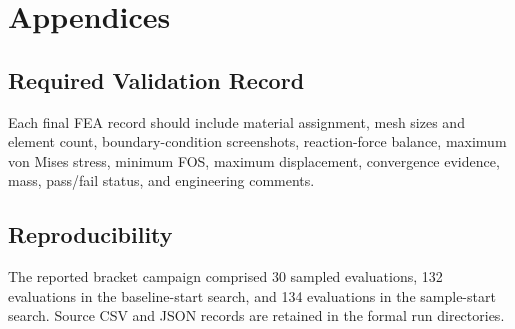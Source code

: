 \chapter{Appendices}

\section{Required Validation Record}
Each final FEA record should include material assignment, mesh sizes and element count, boundary-condition screenshots, reaction-force balance, maximum von Mises stress, minimum FOS, maximum displacement, convergence evidence, mass, pass/fail status, and engineering comments.

\section{Reproducibility}
The reported bracket campaign comprised 30 sampled evaluations, 132 evaluations in the baseline-start search, and 134 evaluations in the sample-start search. Source CSV and JSON records are retained in the formal run directories.
